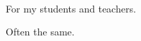 \newpage
\thispagestyle{empty}
~\vfill
\begin{doublespace}
\noindent%
\ttfsegoeuil
\nohyphenation
For my students and teachers.

Often the same.
\end{doublespace}
\vfill
\vfill
